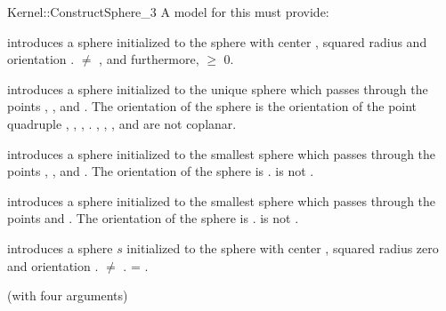 \begin{ccRefFunctionObjectConcept}{Kernel::ConstructSphere_3}
A model for this must provide:


        {introduces a sphere initialized to the sphere with center ,
        squared radius  and orientation
        .
        \ccPrecond {} $\neq$ , and furthermore,
                    $\geq$ 0.}

        {introduces a sphere initialized to the unique sphere which passes
        through the points , ,  and . The
        orientation of the sphere is the orientation of the point quadruple
        , , , .
        \ccPrecond {}, , , and  are not coplanar.}


      {introduces a sphere initialized to the smallest sphere which passes
      through the points , , and . The orientation of
        the sphere is . \ccPrecond {} is not
        .}

        {introduces a sphere initialized to the smallest sphere which passes
        through the points  and . The orientation of
        the sphere is . \ccPrecond {} is not
        .}


      {introduces a sphere $s$ initialized to the sphere with center 
        , squared radius zero and orientation .
        \ccPrecond {} $\neq$ .
        \ccPostcond {} = .}

\ccRefines
{} (with four arguments)

\ccSeeAlso
{}\\
\end{ccRefFunctionObjectConcept}
